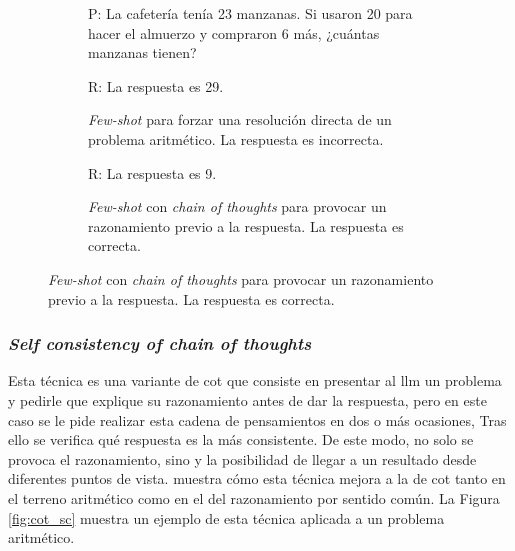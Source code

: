 \begin{figure}[H]
\begin{subfigure}{.48\textwidth}
\begin{mdframed}
        P: La cafetería tenía 23 manzanas. Si usaron 20 para hacer el almuerzo y compraron 6 más, ¿cuántas manzanas tienen?
        \vspace{0.2cm}
      \end{mdframed}
    \end{subfigure}

    \vspace{0.2cm}

    \begin{subfigure}{.48\textwidth}
        \centering
        \begin{mdframed}
        R: La respuesta es 29.
        \end{mdframed}
        \caption{\emph{Few-shot} para forzar una resolución directa de un problema aritmético. La respuesta es incorrecta.}
      \end{subfigure}\hfill
    \begin{subfigure}{.48\textwidth}
      \centering
      \begin{mdframed}
        R:  La respuesta es 9.
      \end{mdframed}
      \caption{\emph{Few-shot} con \emph{chain of thoughts} para provocar un razonamiento previo a la respuesta. La respuesta es correcta.}
    \end{subfigure}

    \label{fig:chain_of_thoughts}
\end{figure}

\subsubsection{\emph{Self consistency of chain of thoughts}}

Esta técnica es una variante de \gls{cot} que consiste en presentar al \gls{llm} un problema y pedirle que explique su razonamiento antes de dar la respuesta, pero en este caso se le pide realizar esta cadena de pensamientos en dos o más ocasiones, Tras ello se verifica qué respuesta es la más consistente. De este modo, no solo se provoca el razonamiento, sino y la posibilidad de llegar a un resultado desde diferentes puntos de vista. \citep{wangSelfConsistencyImprovesChain2023} muestra cómo esta técnica mejora a la de \gls{cot} tanto en el terreno aritmético como en el del razonamiento por sentido común. La Figura \ref{fig:cot_sc} muestra un ejemplo de esta técnica aplicada a un problema aritmético.

